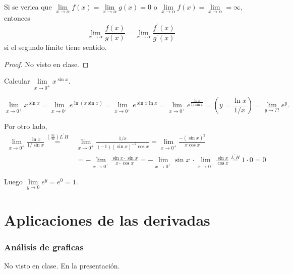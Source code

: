 \begin{theorem}[de L'Hopital]
	Si se verica que \(\lim\limits_{x  \to \alpha} f(x) = \lim\limits_{x  \to \alpha} g(x) = 0 \) o \(\lim\limits_{x  \to \alpha} f(x) = \lim\limits_{x  \to \alpha} = \infty \), entonces
	\[
		\lim\limits_{x  \to \alpha} \frac{f(x )}{g(x)} = \lim\limits_{x  \to \alpha} \frac{f^\prime (x )}{g^\prime (x )}
	\]
	si el segundo límite tiene sentido.
\end{theorem}
\begin{proof}
	No visto en clase. 
\end{proof}

\vspace{0.4cm}
\begin{example}
	Calcular \(\lim\limits_{x  \to 0^{+}} x^{\sin x}\). 
	
	\[\lim\limits_{x  \to 0^{+ } } x^{\sin x} = \lim\limits_{x  \to 0^{+ } } e^{\ln (x \sin x)} = \lim\limits_{x  \to 0^{+ } } e^{\sin x \ln x} = \lim\limits_{x  \to 0^{+ } } e^{\frac{\ln x }{1 / \sin x}} = (y = \frac{\ln x }{1 / x }) = \lim\limits_{y  \to ??} e^{y}     .\]
	
	Por otro lado, 
	\begin{align*}
		\lim\limits_{x  \to 0^{+ } } \frac{\ln x }{1 / \sin x}  \overset{(\frac{\infty}{\infty}) L^\prime H}{=} & \lim\limits_{x \to 0^{+} } \frac{ 1 / x }{(-1)(\sin  x)^{-2} \cos  x } = \lim\limits_{x  \to 0^{+} } \frac{-(\sin x)^{2} }{x \cos  x} \\ & =  -\lim\limits_{x  \to 0^{+ } } \frac{\sin x \cdot \sin x}{x \cdot \cos x} = - \lim\limits_{x  \to 0^{+ } } \sin x\ \cdot \lim\limits_{x  \to 0^{+ } } \frac{\sin x}{\cos x} \overset{L^\prime H}{=} 1 \cdot 0 = 0
	\end{align*}
	
	Luego \(\lim\limits_{y \to 0} e^{y} = e^{0} = 1   \).
\end{example}

\part{Aplicaciones de las derivadas}
\section{Análisis de graficas}
No visto en clase. En la presentación.
